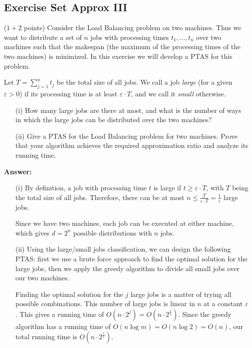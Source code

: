\documentclass{article}
\newcommand{\loadb}{{\sc Load Balancing}\xspace}
\newcommand{\eps}{\varepsilon}
\renewcommand{\leq}{\leqslant}
\renewcommand{\geq}{\geqslant}
\newcounter{rcounter}
\newenvironment{rlist}%
{\begin{list}{\setnr-\arabic{rcounter}}{\usecounter{rcounter}}}{\end{list}}
\begin{document}
    \subsection*{Exercise Set Approx III}
    \begin{rlist}
        \item ($1+2$ points)
        Consider the \loadb problem on two machines.  Thus we want to distribute a set of $n$ jobs with processing times $t_1,\ldots,t_n$ over two machines such that the makespan (the maximum of the processing times of the two machines) is minimized. In this exercise we will develop a PTAS for this problem.
        
        Let $T=\sum_{j=1}^n t_j$ be the total size of all jobs. We call a job \emph{large} (for a given $\eps>0$) if its processing time is at least $\eps \cdot T$, and we call it \emph{small} otherwise.
        \begin{enumerate}
            \item[(i)]
            How many large jobs are there at most, and what is the number of ways in which the large jobs can be distributed over the two machines?
            \item[(ii)]
            Give a PTAS for the \loadb problem for two machines. Prove that your algorithm achieves the required approximation ratio and analyze its running time.
        \end{enumerate}
        
        \textbf{Answer:}
        \begin{enumerate}
            \item[(i)]
            By definition, a job with processing time $t$ is large if $t \geq \eps \cdot T$, with $T$ being the total size of all jobs. Therefore, there can be at most $n \leq \frac{T}{\eps \cdot T} = \frac{1}{\eps}$ large jobs.
            
            Since we have two machines, each job can be executed at either machine, which gives $d = 2^n$ possible distributions with $n$ jobs.
            \item[(ii)]
            Using the large/small jobs classification, we can design the following PTAS: first we use a brute force approach to find the optimal solution for the large jobs, then we apply the greedy algorithm to divide all small jobs over our two machines.
            
            Finding the optimal solution for the $j$ large jobs is a matter of trying all possible combinations. This number of large jobs is linear in $n$ at a constant $\eps$. This gives a running time of $O(n \cdot 2^j)=O(n \cdot 2^{\frac{1}{\eps}})$. Since the greedy algorithm has a running time of $O(n \log m)=O(n \log 2)=O(n)$, our total running time is $O(n \cdot 2^{\frac{1}{\eps}})$.
            

\end{enumerate}
\end{rlist}
\end{document}
